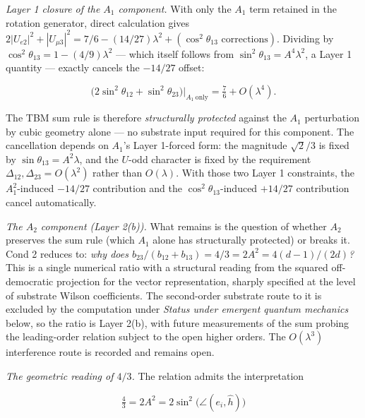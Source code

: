 \documentclass[
]{article}
\begin{document}
\emph{Layer 1 closure of the \(A_1\) component.} With only the \(A_1\)
term retained in the rotation generator, direct calculation gives
\(2|U_{e2}|^2 + |U_{\mu 3}|^2 = 7/6 - (14/27)\lambda^2 + (\cos^2\theta_{13}\text{ corrections})\).
Dividing by \(\cos^2\theta_{13} = 1 - (4/9)\lambda^2\) --- which itself
follows from \(\sin^2\theta_{13} = A^4\lambda^2\), a Layer 1 quantity
--- exactly cancels the \(-14/27\) offset:

\[\bigl(2\sin^2\theta_{12} + \sin^2\theta_{23}\bigr)\big|_{A_1\ \mathrm{only}} = \tfrac{7}{6} + O(\lambda^4).\]

The TBM sum rule is therefore \emph{structurally protected} against the
\(A_1\) perturbation by cubic geometry alone --- no substrate input
required for this component. The cancellation depends on \(A_1\)'s Layer
1-forced form: the magnitude \(\sqrt{2}/3\) is fixed by
\(\sin\theta_{13} = A^2\lambda\), and the \(U\)-odd character is fixed
by the requirement \(\Delta_{12}, \Delta_{23} = O(\lambda^2)\) rather
than \(O(\lambda)\). With those two Layer 1 constraints, the
\(A_1^2\)-induced \(-14/27\) contribution and the
\(\cos^2\theta_{13}\)-induced \(+14/27\) contribution cancel
automatically.

\emph{The \(A_2\) component (Layer 2(b)).} What remains is the question
of whether \(A_2\) preserves the sum rule (which \(A_1\) alone has
structurally protected) or breaks it. Cond 2 reduces to: \emph{why does
\(b_{23}/(b_{12}+b_{13}) = 4/3 = 2A^2 = 4(d-1)/(2d)\)?} This is a single
numerical ratio with a structural reading from the squared
off-democratic projection for the vector representation, sharply
specified at the level of substrate Wilson coefficients. The
second-order substrate route to it is excluded by the computation under
\emph{Status under emergent quantum mechanics} below, so the ratio is
Layer 2(b), with future measurements of the sum probing the
leading-order relation subject to the open higher orders. The
\(O(\lambda^3)\) interference route is recorded and remains open.

\emph{The geometric reading of \(4/3\).} The relation admits the
interpretation

\[\tfrac{4}{3} = 2A^2 = 2\sin^2\!\bigl(\angle(e_i, \hat{h})\bigr)\]
\end{document}
